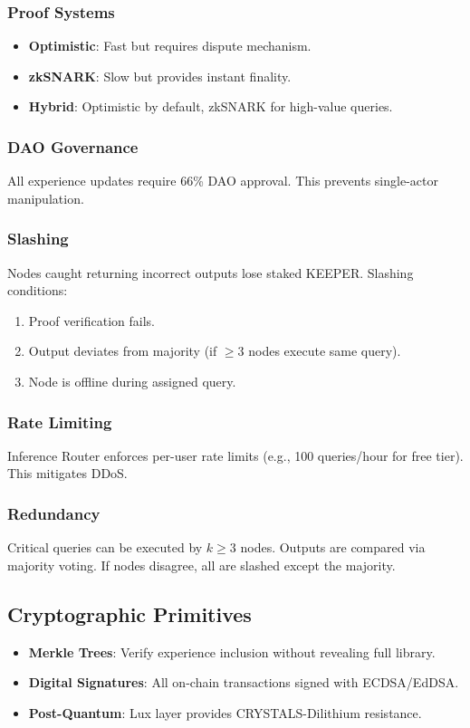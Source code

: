\subsubsection{Proof Systems}

\begin{itemize}
\item \textbf{Optimistic}: Fast but requires dispute mechanism.
\item \textbf{zkSNARK}: Slow but provides instant finality.
\item \textbf{Hybrid}: Optimistic by default, zkSNARK for high-value queries.
\end{itemize}

\subsubsection{DAO Governance}

All experience updates require 66\% DAO approval. This prevents single-actor manipulation.

\subsubsection{Slashing}

Nodes caught returning incorrect outputs lose staked KEEPER. Slashing conditions:
\begin{enumerate}
\item Proof verification fails.
\item Output deviates from majority (if $\geq 3$ nodes execute same query).
\item Node is offline during assigned query.
\end{enumerate}

\subsubsection{Rate Limiting}

Inference Router enforces per-user rate limits (e.g., 100 queries/hour for free tier). This mitigates DDoS.

\subsubsection{Redundancy}

Critical queries can be executed by $k \geq 3$ nodes. Outputs are compared via majority voting. If nodes disagree, all are slashed except the majority.

\subsection{Cryptographic Primitives}

\begin{itemize}
\item \textbf{Merkle Trees}: Verify experience inclusion without revealing full library.
\item \textbf{Digital Signatures}: All on-chain transactions signed with ECDSA/EdDSA.
\item \textbf{Post-Quantum}: Lux layer provides CRYSTALS-Dilithium resistance.
\end{itemize}

